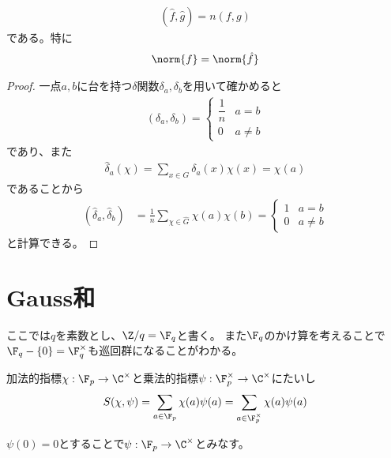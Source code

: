 \documentclass{jsarticle}
\begin{document}
\begin{thm}[Plancherel公式]
\begin{align*}
(\hat{f},\hat{g})=n(f,g)
\end{align*}
である。特に
\begin{align*}
\norm{f}=\norm{\hat{f}}
\end{align*}
\end{thm}
\begin{proof}
一点$a, b$に台を持つ$\delta$関数$\delta_a, \delta_b$を用いて確かめると
\begin{align*}
(\delta_a,\delta_b)=\begin{cases}\dfrac{1}{n}&a=b\\0&a\neq b\end{cases}
\end{align*}
であり、また
\begin{align*}
\hat{\delta}_a(\chi)=\sum_{x\in G}\delta_a(x)\chi(x)=\chi(a)
\end{align*}
であることから
\begin{align*}
(\hat{\delta}_a,\hat{\delta}_b)&=\frac{1}{n}\sum_{\chi\in\hat{G}}\chi(a)\chi(b)=\begin{cases}1&a=b\\0&a\neq b\end{cases}
\end{align*}
と計算できる。
\end{proof}

\section{Gauss和}
ここでは$q$を素数とし、$\Z/q=\F_q$と書く。
また$\F_q$のかけ算を考えることで$\F_q-\{0\}=\F_q^\times$も巡回群になることがわかる。

\begin{dfn}[Gauss和]
加法的指標$\chi:\F_p\to\C^\times$と乗法的指標$\psi:\F_p^\times\to\C^\times$にたいし
\begin{align*}
S(\chi,\psi)=\sum_{a\in\F_p}\chi(a)\psi(a)=\sum_{a\in\F_p^\times}\chi(a)\psi(a)
\end{align*}

$\psi(0)=0$とすることで$\psi:\F_p \to \C^\times$とみなす。
\end{dfn}
\end{document}
